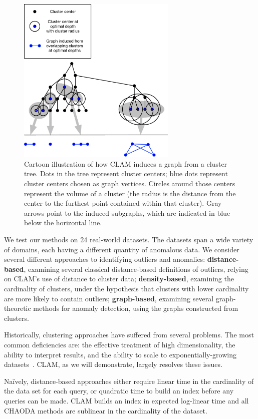 \begin{figure}[ht!]
    \centering
    \includegraphics[width=3in]{images/tree-graph.pdf}
    \caption{Cartoon illustration of how CLAM induces a graph from a cluster tree.
        Dots in the tree represent cluster centers;
        blue dots represent cluster centers chosen as graph vertices.
        Circles around those centers represent the volume of a cluster (the radius is the distance from the center to the furthest point contained within that cluster).
        Gray arrows point to the induced subgraphs, which are indicated in blue below the horizontal line.}
    \label{fig:introduction:graph-generation}
\end{figure}

We test our methods on 24 real-world datasets.
The datasets span a wide variety of domains, each having a different quantity of anomalous data.
We consider several different approaches to identifying outliers and anomalies:
\textbf{distance-based}, examining several classical distance-based definitions of outliers, relying on CLAM's use of distance to cluster data;
\textbf{density-based}, examining the cardinality of clusters, under the hypothesis that clusters with lower cardinality are more likely to contain outliers;
\textbf{graph-based}, examining several graph-theoretic methods for anomaly detection, using the graphs constructed from clusters.

Historically, clustering approaches have suffered from several problems.
The most common deficiencies are: the effective treatment of high dimensionality, the ability to interpret results, and the ability to scale to exponentially-growing datasets~\cite{agrawal1998automatic}.
CLAM, as we will demonstrate, largely resolves these issues.

Na\"ively, distance-based approaches either require linear time in the cardinality of the data set for each query,
or quadratic time to build an index before any queries can be made.
CLAM builds an index in expected log-linear time and all CHAODA methods are sublinear in the cardinality of the dataset.
